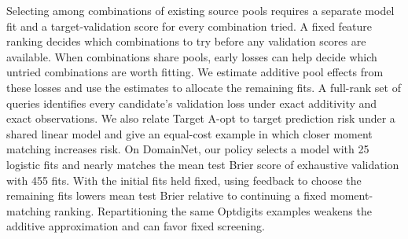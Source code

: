 Selecting among combinations of existing source pools requires a separate model fit and a target-validation score for every combination tried. A fixed feature ranking decides which combinations to try before any validation scores are available. When combinations share pools, early losses can help decide which untried combinations are worth fitting. We estimate additive pool effects from these losses and use the estimates to allocate the remaining fits. A full-rank set of queries identifies every candidate's validation loss under exact additivity and exact observations. We also relate Target A-opt to target prediction risk under a shared linear model and give an equal-cost example in which closer moment matching increases risk. On DomainNet, our policy selects a model with 25 logistic fits and nearly matches the mean test Brier score of exhaustive validation with 455 fits. With the initial fits held fixed, using feedback to choose the remaining fits lowers mean test Brier relative to continuing a fixed moment-matching ranking. Repartitioning the same Optdigits examples weakens the additive approximation and can favor fixed screening.
